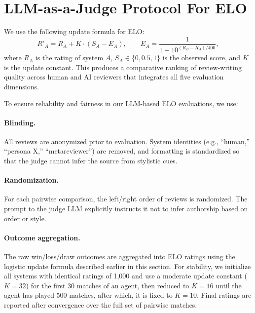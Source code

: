 \documentclass{article} %
\newcommand{\shrink}[1][0.5]{\vspace{-#1\baselineskip}}
\begin{document}
\section{LLM-as-a-Judge Protocol For ELO}
\label{app:elo-judging}
We use the following update formula for ELO:
\[
R'_A = R_A + K \cdot (S_A - E_A), \qquad
E_A = \frac{1}{1 + 10^{(R_B - R_A)/400}},
\]
where $R_A$ is the rating of system $A$, $S_A \in \{0, 0.5, 1\}$ is the observed score, and $K$ is the update constant.
This produces a comparative ranking of review-writing quality across human and AI reviewers that integrates all five evaluation dimensions.

To ensure reliability and fairness in our LLM-based ELO evaluations, we use: 

\paragraph{Blinding.} \shrink[.75] 
All reviews are anonymized prior to evaluation. System identities (e.g., ``human,'' ``persona X,'' ``metareviewer'') are removed, and formatting is standardized so that the judge cannot infer the source from stylistic cues.

\paragraph{Randomization.} \shrink[.75] 
For each pairwise comparison, the left/right order of reviews is randomized. The prompt to the judge LLM explicitly instructs it not to infer authorship based on order or style.


\paragraph{Outcome aggregation.} \shrink[.75] 
The raw win/loss/draw outcomes are aggregated into ELO ratings using the logistic update formula described earlier in this section. For stability, we initialize all systems with identical ratings of 1{,}000 and use a moderate update constant ($K=32$) for the first 30 matches of an agent, then reduced to $K=16$ until the agent has played 500 matches, after which, it is fixed to $K=10$. Final ratings are reported after convergence over the full set of pairwise matches.
\end{document}
